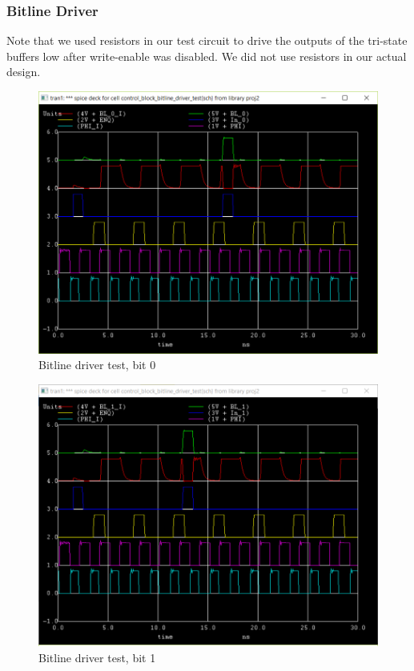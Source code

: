 \documentclass[12pt]{report}
\begin{document}
\subsubsection*{Bitline Driver}
Note that we used resistors in our test circuit to drive the outputs of the tri-state buffers low after write-enable was disabled. We did not use resistors in our actual design.
\begin{figure}[H]
  \centering
    \includegraphics[width=1.0\textwidth]{control_block_bitline_driver_test_0.PNG}
  \caption{Bitline driver test, bit 0}
  \label{fig:control_block_bitline_driver_test}
\end{figure}
\begin{figure}[H]
  \centering
    \includegraphics[width=1.0\textwidth]{control_block_bitline_driver_test_1.PNG}
  \caption{Bitline driver test, bit 1}
  \label{fig:control_block_bitline_driver_test}
\end{figure}
\end{document}
